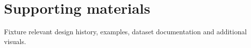 \documentclass[11pt]{article}
\begin{document}



\appendix
\section{Supporting materials}
Fixture relevant design history, examples, dataset documentation and additional visuals.
\end{document}
